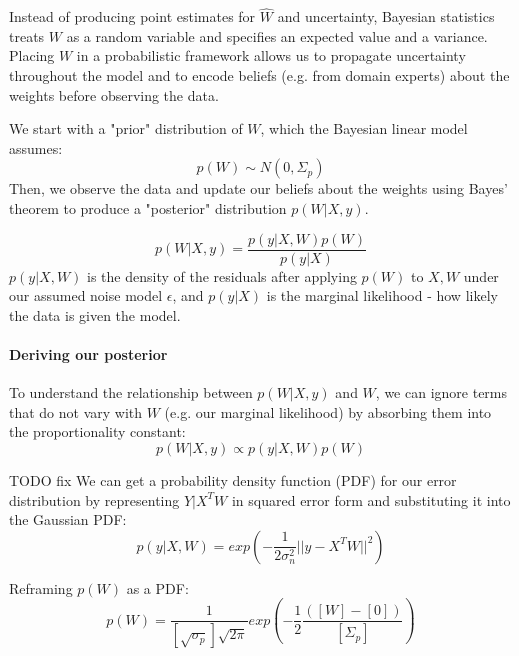 Instead of producing point estimates for $\hat{W}$ and uncertainty, Bayesian statistics treats $W$ as a random variable and specifies an expected value and a variance. Placing $W$ in a probabilistic framework allows us to propagate uncertainty throughout the model and to encode beliefs (e.g. from domain experts) about the weights before observing the data.

We start with a "prior" distribution of $W$, which the Bayesian linear model assumes:
\begin{equation} \label{eq:prior_distribution}
    p(W) \sim N(0, \Sigma_p)
\end{equation}
Then, we observe the data and update our beliefs about the weights using Bayes' theorem to produce a "posterior" distribution $p(W|X,y)$.

\begin{equation*}
    p(W|X,y) = \frac{p(y|X,W)p(W)}{p(y|X)}
\end{equation*}
$p(y|X,W)$ is the density of the residuals after applying $p(W)$ to $X,W$ under our assumed noise model $\epsilon$, and $p(y|X)$ is the marginal likelihood - how likely the data is given the model.   

\paragraph{Deriving our posterior}
To understand the relationship between $p(W|X,y)$ and $W$, we can ignore terms that do not vary with $W$ (e.g. our marginal likelihood) by absorbing them into the proportionality constant:
\begin{equation} \label{eq:posterior}
    p(W|X, y) \propto p(y|X,W)p(W)
\end{equation}


TODO fix
We can get a probability density function (PDF) for our error distribution by representing $Y | X^TW$ in squared error form and substituting it into the Gaussian PDF:
\begin{equation} \label{eq:likelihood}
    p(y|X,W) = exp\left(-\frac{1}{2\sigma^2_n}||y -X^TW||^2\right)
\end{equation}

Reframing $p(W)$ as a PDF:
 \begin{equation*}
     p(W) = \frac{1}{[\sqrt{\sigma_p}]\sqrt{2\pi}} exp\left(-\frac{1}{2}\frac{([W]-[0])}{[\Sigma_p]}\right)
\end{equation*}

